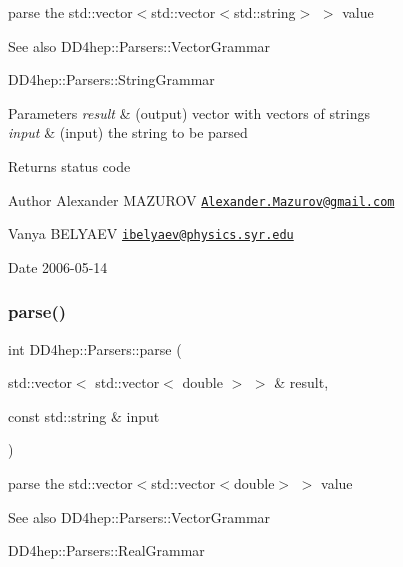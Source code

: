 parse the {\ttfamily std\+::vector$<$std\+::vector$<$std\+::string$>$ $>$} value 

\begin{DoxySeeAlso}{See also}
D\+D4hep\+::\+Parsers\+::\+Vector\+Grammar 

D\+D4hep\+::\+Parsers\+::\+String\+Grammar 
\end{DoxySeeAlso}

\begin{DoxyParams}{Parameters}
{\em result} & (output) vector with vectors of strings \\
\hline
{\em input} & (input) the string to be parsed \\
\hline
\end{DoxyParams}
\begin{DoxyReturn}{Returns}
status code
\end{DoxyReturn}
\begin{DoxyAuthor}{Author}
Alexander M\+A\+Z\+U\+R\+OV \href{mailto:Alexander.Mazurov@gmail.com}{\tt Alexander.\+Mazurov@gmail.\+com} 

Vanya B\+E\+L\+Y\+A\+EV \href{mailto:ibelyaev@physics.syr.edu}{\tt ibelyaev@physics.\+syr.\+edu} 
\end{DoxyAuthor}
\begin{DoxyDate}{Date}
2006-\/05-\/14 
\end{DoxyDate}
\hypertarget{namespace_d_d4hep_1_1_parsers_aaec3e97d2c62b4ca583b113b7c55e44c}{}\label{namespace_d_d4hep_1_1_parsers_aaec3e97d2c62b4ca583b113b7c55e44c} 
\subsubsection{\texorpdfstring{parse()}{parse()}\hspace{0.1cm}{\footnotesize\ttfamily [5/21]}}
{\footnotesize\ttfamily int D\+D4hep\+::\+Parsers\+::parse (\begin{DoxyParamCaption}\item[{std\+::vector$<$ std\+::vector$<$ double $>$ $>$ \&}]{result,  }\item[{const std\+::string \&}]{input }\end{DoxyParamCaption})}



parse the {\ttfamily std\+::vector$<$std\+::vector$<$double$>$ $>$} value 

\begin{DoxySeeAlso}{See also}
D\+D4hep\+::\+Parsers\+::\+Vector\+Grammar 

D\+D4hep\+::\+Parsers\+::\+Real\+Grammar 
\end{DoxySeeAlso}

